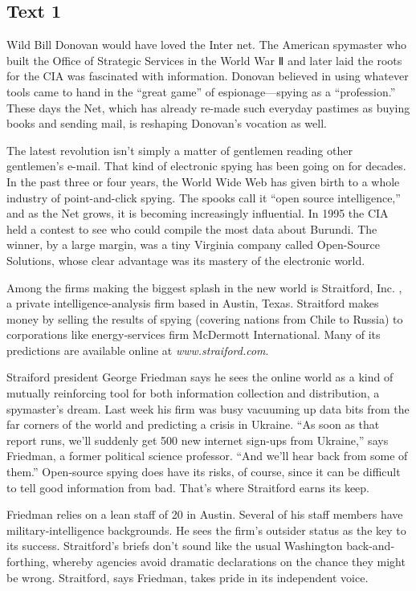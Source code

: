 \newpage
\subsection{Text 1}


Wild Bill Donovan would have loved the Inter net. The American spymaster
who built the Office of Strategic Services in the World War Ⅱ and later
laid the roots for the CIA was fascinated with information. Donovan
believed in using whatever tools came to hand in the ``great game'' of
espionage---spying as a ``profession.'' These days the Net, which has
already re-made such everyday pastimes as buying books and sending mail,
is reshaping Donovan's vocation as well.

The latest revolution isn't simply a matter of gentlemen reading other
gentlemen's e-mail. That kind of electronic spying has been going on for
decades. In the past three or four years, the World Wide Web has given
birth to a whole industry of point-and-click spying. The spooks call it
``open source intelligence,'' and as the Net grows, it is becoming
increasingly influential. In 1995 the CIA held a contest to see who
could compile the most data about Burundi. The winner, by a large
margin, was a tiny Virginia company called Open-Source Solutions, whose
clear advantage was its mastery of the electronic world.

Among the firms making the biggest splash in the new world is
Straitford, Inc. , a private intelligence-analysis firm based in Austin,
Texas. Straitford makes money by selling the results of spying (covering
nations from Chile to Russia) to corporations like energy-services firm
McDermott International. Many of its predictions are available online at \emph{www.straiford.com}.

Straiford president George Friedman says he sees the online world as a
kind of mutually reinforcing tool for both information collection and
distribution, a spymaster's dream. Last week his firm was busy vacuuming
up data bits from the far corners of the world and predicting a crisis
in Ukraine. ``As soon as that report runs, we'll suddenly get 500 new
internet sign-ups from Ukraine,'' says Friedman, a former political
science professor. ``And we'll hear back from some of them.''
Open-source spying does have its risks, of course, since it can be
difficult to tell good information from bad. That's where Straitford
earns its keep.

Friedman relies on a lean staff of 20 in Austin. Several of his staff
members have military-intelligence backgrounds. He sees the firm's
outsider status as the key to its success. Straitford's briefs don't
sound like the usual Washington back-and-forthing, whereby agencies
avoid dramatic declarations on the chance they might be wrong.
Straitford, says Friedman, takes pride in its independent voice.


